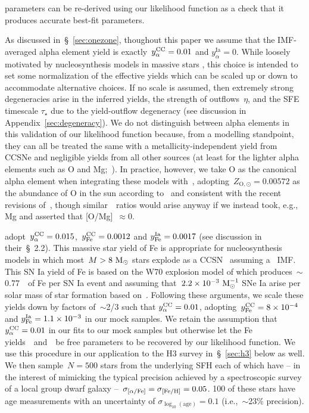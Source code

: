 \documentclass[ms.tex]{subfiles}
\begin{document}
parameters can be re-derived using our likelihood function as a check that it
produces accurate best-fit parameters.
\par
As discussed in~\S~\ref{sec:onezone}, thoughout this paper we assume that the
IMF-averaged alpha element yield is exactly~$y_\alpha^\text{CC} = 0.01$ and
$y_\alpha^\text{Ia} = 0$.
While loosely motivated by nucleosynthesis models in massive stars
\citep[e.g.,][]{Nomoto2013, Sukhbold2016, Limongi2018}, this choice is intended
to set some normalization of the effective yields which can be scaled up or
down to accommodate alternative choices.
If no scale is assumed, then extremely strong degeneracies arise in the
inferred yields, the strength of outflows~$\eta$, and the SFE timescale
$\tau_\star$ due to the yield-outflow degeneracy (see discussion in
Appendix~\ref{sec:degeneracy}).
We do not distinguish between alpha elements in this validation of our
likelihood function because, from a modelling standpoint, they can all be
treated the same with a metallicity-independent yield from CCSNe and negligible
yields from all other sources (at least for the lighter alpha elements such as
O and Mg;~\citealp{Johnson2019}).
In practice, however, we take O as the canonical alpha element when integrating
these models with~\vice, adopting~$Z_{\text{O},\odot} = 0.00572$ as the
abundance of O in the sun according to~\citet{Asplund2009} and consistent with
the recent revisions of~\citet*{Asplund2021}, though similar~\afe~ratios would
arise anyway if we instead took, e.g., Mg and asserted that [O/Mg]~$\approx 0$.
\par
\citet{Weinberg2017} adopt~$y_\alpha^\text{CC} = 0.015$,~$y_\text{Fe}^\text{CC} = 0.0012$ and
$y_\text{Fe}^\text{Ia} = 0.0017$ (see discussion in their~\S~2.2).
This massive star yield of Fe is appropriate for nucleosynthesis models in
which most~$M > 8~\text{M}_\odot$ stars explode as a CCSN~\citep[e.g.,][]{Woosley1995,
Chieffi2004, Chieffi2013, Nomoto2013} assuming a~\citet{Kroupa2001} IMF.
This SN Ia yield of Fe is based on the W70 explosion model of
\citet{Iwamoto1999} which produces~$\sim$0.77~\msun~of Fe per SN Ia event and
assuming that~$2.2\times10^{-3}~\text{M}_\odot^{-1}$ SNe Ia arise per solar mass of
star formation based on~\citet{Maoz2012a}.
Following these arguments, we scale these yields down by factors of~$\sim$2/3
such that $y_\alpha^\text{CC} = 0.01$, adopting~$y_\text{Fe}^\text{CC} = 8\times10^{-4}$ and
$y_\text{Fe}^\text{Ia} = 1.1\times10^{-3}$ in our mock samples.
We retain the assumption that~$y_\alpha^\text{CC} = 0.01$ in our fits to our mock samples
but otherwise let the Fe yields~\yfecc~and~\yfeia~be free parameters to be
recovered by our likelihood function.
We use this procedure in our application to the H3 survey in~\S~\ref{sec:h3}
below as well.
We then sample~$N = 500$ stars from the underlying SFH each of which have -- in
the interest of mimicking the typical precision achieved by a spectroscopic
survey of a local group dwarf galaxy --~$\sigma_{\text{[$\alpha$/Fe]}} = \sigma_{\text{[Fe/H]}} = 0.05$.
100 of these stars have age measurements with an uncertainty of
$\sigma_{\log_{10}(\text{age})} = 0.1$ (i.e.,~$\sim$23\% precision).
\end{document}
